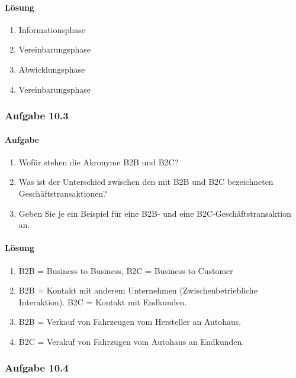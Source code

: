     \paragraph*{Lösung}
        \begin{enumerate}[label=\alph*)]
            \item Informationsphase
            \item Vereinbarungsphase
            \item Abwicklungsphase
            \item Vereinbarungsphase
        \end{enumerate}

\subsubsection*{Aufgabe 10.3}
    \paragraph*{Aufgabe}
        \begin{enumerate}[label=\alph*)]
            \item Wofür stehen die Akronyme B2B und B2C?
            \item Was ist der Unterschied zwischen den mit B2B und B2C bezeichneten Geschäftstransaktionen?
            \item Geben Sie je ein Beispiel für eine B2B- und eine B2C-Geschäftstransaktion an.
        \end{enumerate}
    \paragraph*{Lösung}
        \begin{enumerate}[label=\alph*)]
            \item B2B = Business to Business, B2C = Business to Customer
            \item B2B = Kontakt mit anderem Unternehmen (Zwischenbetriebliche Interaktion). B2C = Kontakt mit Endkunden.
            \item B2B = Verkauf von Fahrzeugen vom Hersteller an Autohaus.
            \item B2C = Verakuf von Fahrzugen vom Autohaus an Endkunden.
        \end{enumerate}

\subsubsection*{Aufgabe 10.4}

